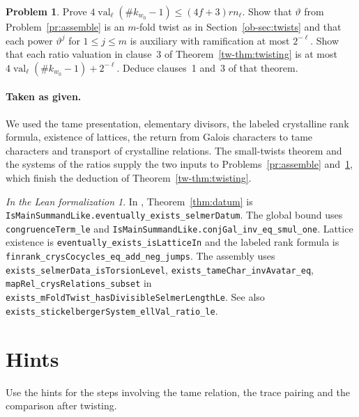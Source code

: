 \documentclass[reqno]{amsart}
\theoremstyle{definition}
\newtheorem{problem}{Problem}[section]
\theoremstyle{plain}
\theoremstyle{remark}
\newtheorem*{leanremark}{In the Lean formalization}
\newcommand{\val}{\operatorname{val}}
\begin{document}
\begin{problem}\label{pr:twisting}
Prove \(4\val_\ell(\#k_{w_0}-1)\le(4f+3)rn_\ell\).  Show that \(\vartheta\) from Problem~\ref{pr:assemble} is an \(m\)-fold twist as in Section~\ref{ob-sec:twists} and that each power \(\vartheta^j\) for \(1\le j\le m\) is auxiliary with ramification at most \(2^{-\ell}\).  Show that each ratio valuation in clause~3 of Theorem~\ref{tw-thm:twisting} is at most \(4\val_\ell(\#k_{w_0}-1)+2^{-\ell}\).  Deduce clauses~1 and~3 of that theorem.
\end{problem}

\paragraph{Taken as given.}
We used the tame presentation, elementary divisors, the labeled crystalline rank formula, existence of lattices, the return from Galois characters to tame characters and transport of crystalline relations.  The small-twists theorem and the systems of the ratios supply the two inputs to Problems~\ref{pr:assemble} and~\ref{pr:twisting}, which finish the deduction of Theorem~\ref{tw-thm:twisting}.

\begin{leanremark}
In \cite{GL}, Theorem~\ref{thm:datum} is
\nolinkurl{IsMainSummandLike.eventually_exists_selmerDatum}.
The global bound uses \nolinkurl{congruenceTerm_le} and
\nolinkurl{IsMainSummandLike.conjGal_inv_eq_smul_one}.
Lattice existence is \nolinkurl{eventually_exists_isLatticeIn} and the labeled rank formula is
\nolinkurl{finrank_crysCocycles_eq_add_neg_jumps}.
The assembly uses \nolinkurl{exists_selmerData_isTorsionLevel},
\nolinkurl{exists_tameChar_invAvatar_eq},
\nolinkurl{mapRel_crysRelations_subset} in
\nolinkurl{exists_mFoldTwist_hasDivisibleSelmerLengthLe}.
See also \nolinkurl{exists_stickelbergerSystem_ellVal_ratio_le}.
\end{leanremark}

\section*{Hints}

Use the hints for the steps involving the tame relation, the trace pairing and the comparison after twisting.
\end{document}
